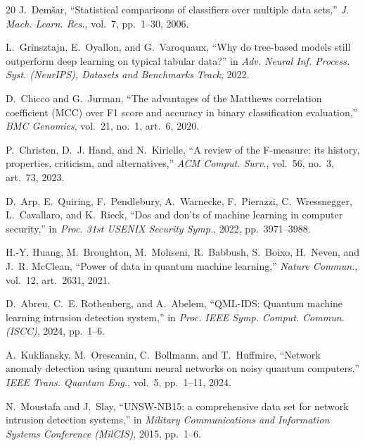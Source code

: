 \documentclass[journal]{IEEEtran}
\begin{document}
\begin{thebibliography}{20}
J.~Dem\v{s}ar, ``Statistical comparisons of classifiers over multiple data
sets,'' \emph{J. Mach. Learn. Res.}, vol.~7, pp.~1--30, 2006.

L.~Grinsztajn, E.~Oyallon, and G.~Varoquaux, ``Why do tree-based models
still outperform deep learning on typical tabular data?'' in \emph{Adv.
Neural Inf. Process. Syst. (NeurIPS), Datasets and Benchmarks Track},
2022.

D.~Chicco and G.~Jurman, ``The advantages of the Matthews correlation
coefficient (MCC) over F1 score and accuracy in binary classification
evaluation,'' \emph{BMC Genomics}, vol.~21, no.~1, art.~6, 2020.

P.~Christen, D.~J. Hand, and N.~Kirielle, ``A review of the F-measure: its
history, properties, criticism, and alternatives,'' \emph{ACM Comput.
Surv.}, vol.~56, no.~3, art.~73, 2023.

D.~Arp, E.~Quiring, F.~Pendlebury, A.~Warnecke, F.~Pierazzi,
C.~Wressnegger, L.~Cavallaro, and K.~Rieck, ``Dos and don'ts of machine
learning in computer security,'' in \emph{Proc. 31st USENIX Security
Symp.}, 2022, pp.~3971--3988.

H.-Y. Huang, M.~Broughton, M.~Mohseni, R.~Babbush, S.~Boixo, H.~Neven, and
J.~R. McClean, ``Power of data in quantum machine learning,'' \emph{Nature
Commun.}, vol.~12, art.~2631, 2021.

D.~Abreu, C.~E. Rothenberg, and A.~Abelem, ``QML-IDS: Quantum machine
learning intrusion detection system,'' in \emph{Proc. IEEE Symp. Comput.
Commun. (ISCC)}, 2024, pp.~1--6.

A.~Kukliansky, M.~Orescanin, C.~Bollmann, and T.~Huffmire, ``Network
anomaly detection using quantum neural networks on noisy quantum
computers,'' \emph{IEEE Trans. Quantum Eng.}, vol.~5, pp.~1--11, 2024.

N.~Moustafa and J.~Slay,
``UNSW-NB15: a comprehensive data set for network intrusion detection
  systems,'' in \emph{Military Communications and Information Systems
  Conference (MilCIS)}, 2015, pp.~1--6.

\end{thebibliography}
\end{document}

